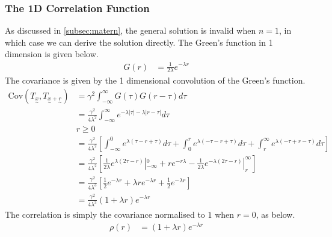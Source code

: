\documentclass[12pt,a4paper]{article} %
\newcommand{\ve}[1]{\underset{\sim}{#1}}
\begin{document}
\subsubsection{The 1D Correlation Function}
\label{subsec:1d_correlation}
As discussed in \ref{subsec:matern}, the general solution is invalid when $n=1$, in which case we can derive the solution directly. The Green's function in 1 dimension is given below.
\begin{align*}
    G(r)&=\frac{1}{2\lambda}e^{-\lambda r}
\end{align*}
The covariance is given by the 1 dimensional convolution of the Green's function.
\begin{align*}
    \text{Cov}(T_{\ve{x}},T_{\ve{x}+\ve{r}})&=\gamma^2 \int_{-\infty}^\infty G(\tau)G(r-\tau)d\tau\\
    &=\frac{\gamma^2}{4\lambda^2}\int_{-\infty}^\infty e^{-\lambda|\tau|-\lambda|r-\tau|}d\tau\\
    &r\geq0\\
    &=\frac{\gamma^2}{4\lambda^2}\left[\int_{-\infty}^0e^{\lambda(\tau-r+\tau)}d\tau+\int_0^re^{\lambda(-\tau-r+\tau)}d\tau+\int_r^\infty e^{\lambda(-\tau+r-\tau)}d\tau\right]\\
    &=\frac{\gamma^2}{4\lambda^2}\left[\frac{1}{2\lambda}e^{\lambda(2\tau-r)}|_{-\infty}^0+re^{-r\lambda}-\frac{1}{2\lambda} e^{-\lambda(2\tau-r)}|_r^\infty\right]\\
    &=\frac{\gamma^2}{4\lambda^3}\left[\frac{1}{2}e^{-\lambda r}+\lambda re^{-\lambda r}+\frac{1}{2} e^{-\lambda r}\right]\\
    &=\frac{\gamma^2}{4\lambda^3}(1+\lambda r)e^{-\lambda r}
\end{align*}
The correlation is simply the covariance normalised to $1$ when $r=0$, as below.
\begin{align*}
    \rho(r)&=(1+\lambda r)e^{-\lambda r}
\end{align*}
\end{document}
